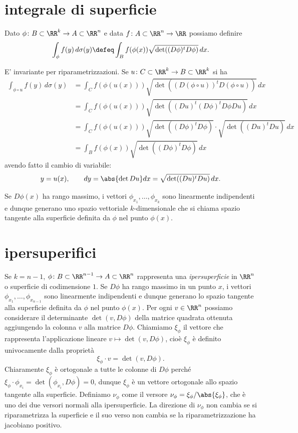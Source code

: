\section{integrale di superficie}

Dato $\phi\colon B\subset \RR^k \to A\subset \RR^n$
e data $f\colon A\subset \RR^n\to \RR$ 
possiamo definire
\[
  \int_\phi f(y) \, d\sigma(y) 
  \defeq \int_B f(\phi(x)) \sqrt{\det ((D\phi)^t D\phi)}\, dx.
\]

E' invariante per riparametrizzazioni.
Se $u\colon C\subset \RR^k \to B\subset \RR^k$ si ha 
\begin{align*}
  \int_{\phi\circ u} f(y) \, d\sigma(y) 
  &= \int_C f(\phi(u(x))) \sqrt{\det ((D(\phi\circ u))^t D(\phi\circ u))}\, dx \\
  &= \int_C f(\phi(u(x))) \sqrt{\det ((Du)^t (D\phi)^t D\phi Du)}\, dx \\
  &= \int_C f(\phi(u(x))) \sqrt{\det ((D\phi)^t D\phi)}\cdot \sqrt{\det ((Du)^t Du)}\, dx \\
  &= \int_B f(\phi(x)) \sqrt{\det ((D\phi)^t D\phi)}\, dx
\end{align*}
avendo fatto il cambio di variabile:
\[
  y = u(x), \qquad dy = \abs{\det Du} dx = \sqrt{\det ((Du)^t Du)}\, dx.
\]

Se $D\phi(x)$ ha rango massimo, i vettori $\phi_{x_1},\dots,\phi_{x_k}$
sono linearmente indipendenti e dunque 
generano uno spazio vettoriale $k$-dimensionale 
che si chiama spazio tangente alla superficie definita da $\phi$ nel punto $\phi(x)$.


\section{ipersuperifici}

Se $k=n-1$, $\phi\colon B\subset \RR^{n-1} \to A\subset \RR^n$ 
rappresenta una \emph{ipersuperficie} in $\RR^n$ o superficie di codimensione $1$.
Se $D\phi$ ha rango massimo in un punto $x$, 
i vettori $\phi_{x_1},\dots,\phi_{x_{n-1}}$ 
sono linearmente indipendenti e dunque
generano lo spazio tangente alla superficie definita da $\phi$ nel punto $\phi(x)$.
Per ogni $v\in \RR^n$ possiamo considerare il determinante $\det(v, D\phi)$ 
della matrice quadrata ottenuta aggiungendo la colonna $v$ alla matrice $D\phi$.
Chiamiamo $\xi_\phi$ il vettore che rappresenta l'applicazione lineare $v\mapsto \det(v, D\phi)$, 
cioè $\xi_\phi$ è definito univocamente dalla proprietà
\[
  \xi_\phi \cdot v = \det(v,D\phi).
\]
Chiaramente $\xi_\phi$ è ortogonale a tutte le colonne di $D\phi$ perché
$\xi_\phi \cdot \phi_{x_i} = \det(\phi_{x_i}, D\phi) = 0$,
dunque $\xi_\phi$ è un vettore ortogonale allo spazio tangente alla superficie.
Definiamo $\nu_\phi$ come il versore $\nu_\phi=\xi_\phi/\abs{\xi_\phi}$, 
che è uno dei due versori normali alla ipersuperficie.
La direzione di $\nu_\phi$ non cambia se si riparametrizza la superficie
e il suo verso non cambia se la riparametrizzazione ha jacobiano positivo.

